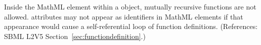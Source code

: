 Inside the  MathML element within a \FunctionDefinition object, mutually recursive functions are not allowed.  \FunctionDefinition {} attributes may not appear as identifiers in  MathML elements if that appearance would cause a self-referential loop of function definitions.  (References: SBML L2V5 Section~\ref{sec:functiondefinition}.)
